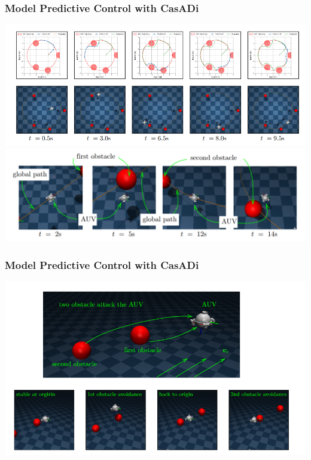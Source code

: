 \documentclass[9pt]{beamer}
\begin{document}
		\begin{frame}
			\frametitle{Model Predictive Control with CasADi}
			\begin{center}
				\includegraphics[width=0.9\linewidth, fbox]{images/mjc-odin1m.png}
				\includegraphics[width=0.9\linewidth, fbox]{images/mjc-odin3.png}
			\end{center}
		\end{frame}
	
		\begin{frame}
			\frametitle{Model Predictive Control with CasADi}
			\begin{center}
				\includegraphics[width=0.9\linewidth, fbox]{images/mjc-odin2.png}
			\end{center}
		\end{frame}
	
\end{document}
